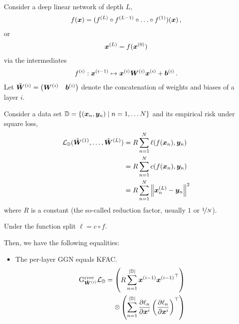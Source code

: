 \begin{test}[KFAC]
  Consider a deep linear network of depth $L$,
  \begin{align*}
    f({\bm{x}}) = (f^{(L)} \circ f^{(L-1)} \circ \ldots \circ f^{(1)})({\bm{x}})\,,
  \end{align*}
  or
  \begin{align*}
    {\bm{x}}^{(L)} = f({\bm{x}}^{(0)})
  \end{align*}
  via the intermediates
  \begin{align*}
    f^{(i)}:  {\bm{x}}^{(i-1)} \mapsto {\bm{x}}^{(i)} {\bm{W}}^{(i)} {\bm{x}}^{(i)} + {\bm{b}}^{(i)}\,.
  \end{align*}
  Let $\tilde{{\bm{W}}}^{(i)} = \begin{pmatrix} {\bm{W}}^{(i)} & {\bm{b}}^{(i)}\end{pmatrix}$ denote the concatenation of weights and biases of a layer $i$.

  Consider a data set ${\mathbb{D}} = \left\{ ({\bm{x}}_n, {\bm{y}}_n) \mid n = 1, \dots N \right\}$ and its empirical risk under square loss,
  \begin{align*}
    {\mathcal{L}}_{{\mathbb{D}}}(\tilde{{\bm{W}}}^{(1)}, \dots, \tilde{{\bm{W}}}^{(L)})
    &=
      R \sum_{n=1}^N \ell(f({\bm{x}}_n), {\bm{y}}_n)
    \\
    &=
      R \sum_{n=1}^N c(f({\bm{x}}_n), {\bm{y}}_n)
    \\
    &=
      R \sum_{n=1}^N \left\lVert {\bm{x}}_n^{(L)} - {\bm{y}}_n  \right\rVert^2
  \end{align*}
  where $R$ is a constant (the so-called reduction factor, usually $1$ or $\nicefrac{1}{N}$).

  Under the function split $\ell = c \circ f$.

  Then, we have the following equalities:
  \begin{itemize}
  \item The per-layer GGN equals KFAC.
    \begin{align*}
      \mathrm{G}^{\operatorname{rvec}}_{\tilde{{\bm{W}}}^{(i)}} {\mathcal{L}}_{{\mathbb{D}}}
      =
      \left( R \sum_{n=1}^{|{\mathbb{D}}|} {\bm{x}}^{(i-1)} {{\bm{x}}^{(i-1)}}^{\top}  \right)
      \\
      \otimes
      \left(
      \sum_{n=1}^{|{\mathbb{D}}|} \frac{\partial \ell_n}{\partial {\bm{x}}^i}
      \left(
      \frac{\partial \ell_n}{\partial {\bm{x}}^i}
      \right)^{\top}
      \right)
    \end{align*}
  \end{itemize}
\end{test}

\switchcolumn[1]
\switchcolumn[0]

